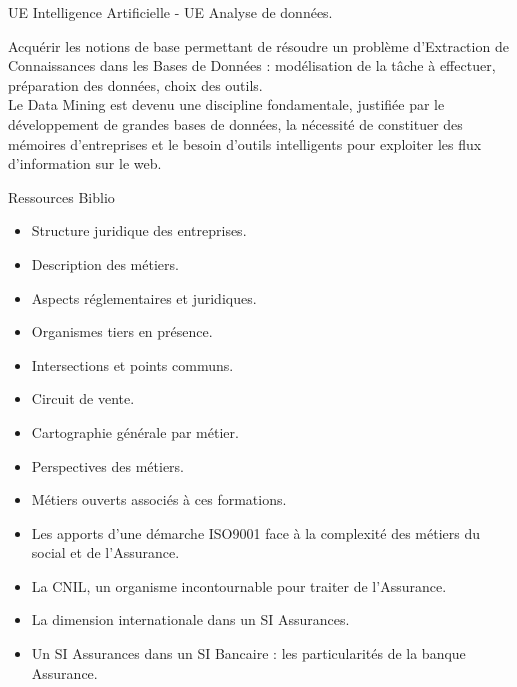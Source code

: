 {UE Intelligence Artificielle - UE Analyse de données.} 
{\begin{itemize} 
  \ObjItem Acquérir les notions de base permettant de résoudre un problème
d'Extraction de Connaissances dans les Bases de Données : modélisation de la tâche à effectuer, préparation des données, choix des outils.\\
Le Data
Mining est devenu une discipline fondamentale, justifiée par le
développement de grandes bases de données, la nécessité de constituer
des mémoires d'entreprises et le besoin d'outils intelligents pour exploiter
les flux d'information sur le web.
\end{itemize} 
} 
{Ressources} 
{Biblio} 
 
\vfill

{
\begin{itemize} 
\item Structure juridique des entreprises.
\item Description des métiers.
\item Aspects réglementaires et juridiques.
\item Organismes tiers en présence.
\item Intersections et points communs.
\item Circuit de vente.
\item Cartographie générale par métier.
\item Perspectives des métiers.
\item Métiers ouverts associés à ces formations.
\item Les apports d'une démarche ISO9001 face à la complexité des métiers du
social et de l'Assurance.
\item La CNIL, un organisme incontournable pour traiter de l'Assurance.
\item La dimension internationale dans un SI Assurances.
\item Un SI Assurances dans un SI Bancaire : les particularités de la banque
Assurance.
\end{itemize} 
} 
